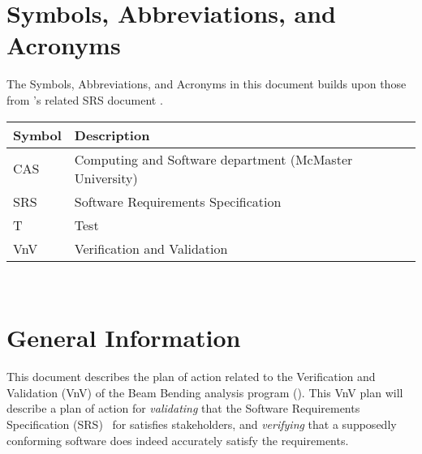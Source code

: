 \documentclass[12pt, titlepage]{article}
\begin{document}
\tableofcontents

\newpage{}

\listoftables


\newpage

\section{Symbols, Abbreviations, and Acronyms}

The Symbols, Abbreviations, and Acronyms in this document builds upon those from
\progname{}'s related SRS document \cite{BalaciBeamBendingSRS2023}.\\

\renewcommand{\arraystretch}{1.2}
\begin{tabular}{l l}
    \toprule
    \textbf{Symbol} & \textbf{Description}                                    \\
    \midrule
    CAS             & Computing and Software department (McMaster University) \\
    SRS             & Software Requirements Specification                     \\
    T               & Test                                                    \\
    VnV             & Verification and Validation                             \\
    \bottomrule
\end{tabular}\\

\newpage



\section{General Information}

This document describes the plan of action related to the Verification and
Validation (VnV) of the Beam Bending analysis program (\progname{}). This VnV
plan will describe a plan of action for \textit{validating} that the Software
Requirements Specification (SRS)~\cite{BalaciBeamBendingSRS2023} for \progname{}
satisfies stakeholders, and \textit{verifying} that a supposedly conforming
software does indeed accurately satisfy the requirements.
\end{document}
